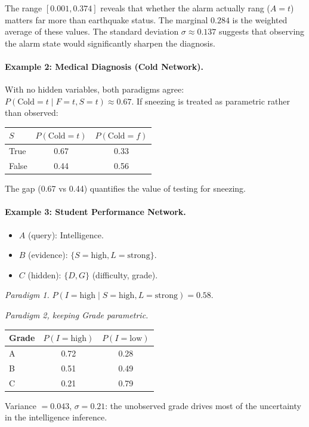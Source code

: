 The range $[0.001,0.374]$ reveals that whether the alarm actually rang
($A=t$) matters far more than earthquake status. The marginal $0.284$ is
the weighted average of these values. The standard deviation $\sigma\approx0.137$
suggests that observing the alarm state would significantly sharpen the
diagnosis.

\paragraph{Example 2: Medical Diagnosis (Cold Network).}
With no hidden variables, both paradigms agree:
$P(\text{Cold}=t\mid F=t,S=t)\approx0.67$.
If sneezing is treated as parametric rather than observed:
\begin{center}
\begin{tabular}{lcc}
\hline
$S$ & $P(\text{Cold}=t)$ & $P(\text{Cold}=f)$\\\hline
True  & 0.67 & 0.33\\
False & 0.44 & 0.56\\\hline
\end{tabular}
\end{center}
The gap (0.67 vs 0.44) quantifies the value of testing for sneezing.

\paragraph{Example 3: Student Performance Network.}
\begin{itemize}
    \item $A$ (query): Intelligence.
    \item $B$ (evidence): $\{S=\text{high},L=\text{strong}\}$.
    \item $C$ (hidden): $\{D,G\}$ (difficulty, grade).
\end{itemize}

\textit{Paradigm 1.} $P(I=\text{high}\mid S=\text{high},L=\text{strong})=0.58$.

\textit{Paradigm 2, keeping Grade parametric.}
\begin{center}
\begin{tabular}{lcc}
\hline
\textbf{Grade} & $P(I=\text{high})$ & $P(I=\text{low})$\\\hline
A & 0.72 & 0.28 \\
B & 0.51 & 0.49 \\
C & 0.21 & 0.79 \\\hline
\end{tabular}
\end{center}
Variance $=0.043$, $\sigma=0.21$: the unobserved grade drives most of the
uncertainty in the intelligence inference.

